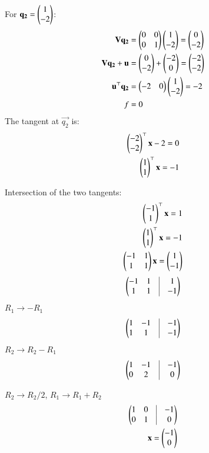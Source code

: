 \documentclass[journal]{IEEEtran}
\begin{document}
    For $\mathbf{q_2} = \begin{pmatrix}1 \\ -2\end{pmatrix}$:
    \begin{align}
    \mathbf{V}\mathbf{q_2} &= \begin{pmatrix}0 & 0 \\ 0 & 1\end{pmatrix}\begin{pmatrix}1 \\ -2\end{pmatrix} = \begin{pmatrix}0 \\ -2\end{pmatrix} \\
    \mathbf{V}\mathbf{q_2} + \mathbf{u} &= \begin{pmatrix}0 \\ -2\end{pmatrix} + \begin{pmatrix}-2 \\ 0\end{pmatrix} = \begin{pmatrix}-2 \\ -2\end{pmatrix} \\
    \mathbf{u}^{\top}\mathbf{q_2} &= \begin{pmatrix}-2 & 0\end{pmatrix}\begin{pmatrix}1 \\ -2\end{pmatrix} = -2 \\
    f &= 0
    \end{align}
    The tangent at $\vec{q_2}$ is:
    \begin{align}
    \begin{pmatrix}-2 \\ -2\end{pmatrix}^\top\mathbf{x} - 2 = 0\\
    \begin{pmatrix}1 \\ 1\end{pmatrix}^\top\mathbf{x}=-1
    \end{align}
      
      
    Intersection of the two tangents:
    \begin{align}
     \begin{pmatrix}-1 \\ 1\end{pmatrix}^\top\mathbf{x}=1\\
    \begin{pmatrix}1 \\ 1\end{pmatrix}^\top\mathbf{x}=-1\\
    \begin{pmatrix}-1 & 1 \\ 1 & 1\end{pmatrix}\mathbf{x}=\begin{pmatrix}1\\-1\end{pmatrix}
    \end{align}
   \begin{align}
   \myvec{
   -1 & 1 & \vrule & 1\\ 1 & 1 & \vrule & -1 
   }
   \end{align}
   $R_1\rightarrow -R_1$
   \begin{align}
   \myvec{
   1 & -1 & \vrule & -1\\ 1 & 1 & \vrule & -1 
   }
   \end{align}
   $R_2\rightarrow R_2-R_1$
   \begin{align}
   \myvec{
   1 & -1 & \vrule & -1\\ 0 & 2 & \vrule & 0
   }
   \end{align}

   $R_2\rightarrow R_2/2$, $R_1\rightarrow R_1+R_2$
   \begin{align}
   \myvec{
   1 & 0 & \vrule & -1\\ 0 & 1 & \vrule & 0
   }\\
   \vec{x}=\myvec{-1\\0}
   \end{align}
   
\end{document}
